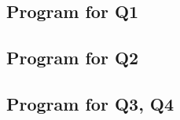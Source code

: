 \documentclass[12pt]{article}
\begin{document}
\subsection*{Program for Q1}


\subsection*{Program for Q2}



\subsection*{Program for Q3, Q4}

\end{document}
